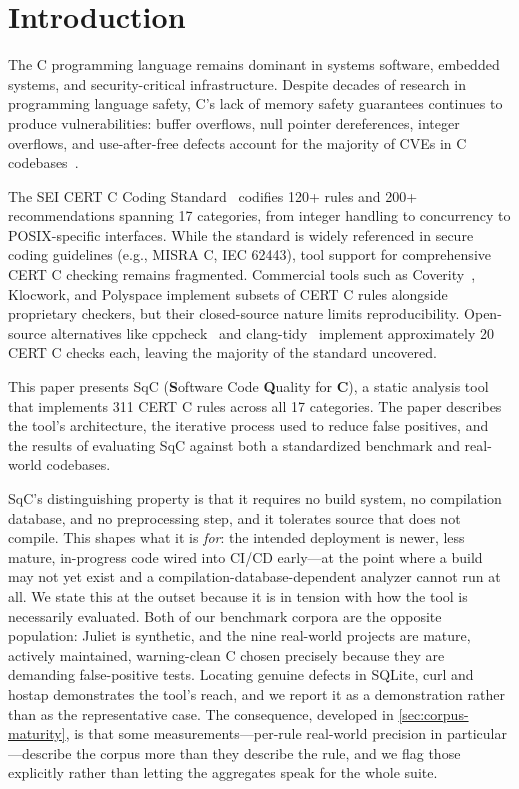 \section{Introduction}
\label{sec:intro}

The C programming language remains dominant in systems software,
embedded systems, and security-critical infrastructure.  Despite decades
of research in programming language safety, C's lack of memory safety
guarantees continues to produce vulnerabilities: buffer overflows, null
pointer dereferences, integer overflows, and use-after-free defects
account for the majority of CVEs in C codebases~\cite{cwe-top25}.

The SEI CERT C Coding Standard~\cite{cert-c} codifies 120+ rules and
200+ recommendations spanning 17 categories, from integer handling to
concurrency to POSIX-specific interfaces.  While the standard is widely
referenced in secure coding guidelines (e.g., MISRA C, IEC 62443),
tool support for comprehensive CERT C checking remains fragmented.
Commercial tools such as Coverity~\cite{coverity}, Klocwork, and
Polyspace implement subsets of CERT C rules alongside proprietary
checkers, but their closed-source nature limits reproducibility.
Open-source alternatives like cppcheck~\cite{cppcheck} and
clang-tidy~\cite{clang-tidy} implement approximately 20 CERT C checks
each, leaving the majority of the standard uncovered.

This paper presents SqC (\textbf{S}oftware Code \textbf{Q}uality for
\textbf{C}), a static analysis tool that implements 311 CERT C rules
across all 17 categories.  The paper describes the tool's architecture,
the iterative process used to reduce false positives, and the results of
evaluating SqC against both a standardized benchmark and real-world
codebases.

SqC's distinguishing property is that it requires no build system, no
compilation database, and no preprocessing step, and it tolerates source
that does not compile.  This shapes what it is \emph{for}: the intended
deployment is newer, less mature, in-progress code wired into CI/CD
early---at the point where a build may not yet exist and a
compilation-database-dependent analyzer cannot run at all.  We state this
at the outset because it is in tension with how the tool is necessarily
evaluated.  Both of our benchmark corpora are the opposite population:
Juliet is synthetic, and the nine real-world projects are mature,
actively maintained, warning-clean C chosen precisely because they are
demanding false-positive tests.  Locating genuine defects in SQLite,
curl and hostap demonstrates the tool's reach, and we report it as a
demonstration rather than as the representative case.  The consequence,
developed in \cref{sec:corpus-maturity}, is that some measurements---per-rule
real-world precision in particular---describe the corpus more than they
describe the rule, and we flag those explicitly rather than letting the
aggregates speak for the whole suite.

